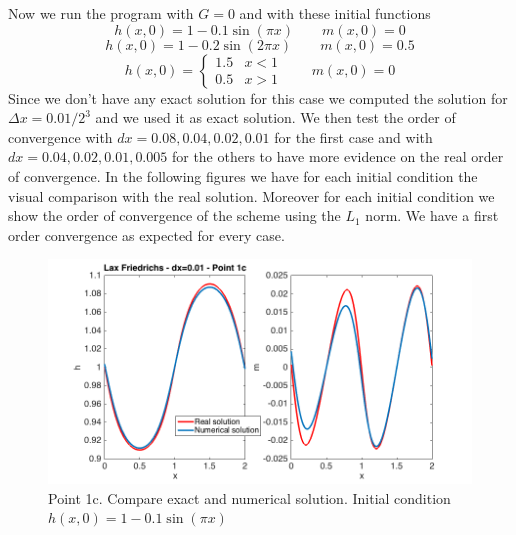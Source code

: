 \documentclass[oneside,12pt]{book}  %
\theoremstyle{plain}
\theoremstyle{definition}
\theoremstyle{remark}
\numberwithin{equation}{chapter} %
\begin{document}
Now we run the program with $G=0$ and with these initial functions
\begin{equation}
  \label{eq:initial_solution_1c_1}
  h(x,0)=1-0.1\sin(\pi x)\quad \quad m(x,0)=0
\end{equation}
\begin{equation}
  \label{eq:initial_solution_1c_2}
  h(x,0)=1-0.2\sin(2\pi x)\quad \quad m(x,0)=0.5
\end{equation}
\begin{equation}
  \label{eq:initial_solution_1c_2}
  h(x,0)=\left\{ \begin{matrix} 1.5 & x<1 \\ 0.5 &x>1\end{matrix}\right. \quad \quad m(x,0)=0
\end{equation}
Since we don't have any exact solution for this case we computed the
solution for $\Delta x=0.01/2^3$ and we used it as exact solution. We
then test the order of convergence with $dx=0.08, 0.04, 0.02,
0.01$ for the first case and with $dx=0.04, 0.02,
0.01, 0.005$ for the others to have more evidence on the real order of
convergence. In the following figures we have for each initial
condition the visual comparison with the real solution. Moreover for
each initial condition we show the order of convergence of the scheme
using the $L_1$ norm. We have a first order convergence as expected
for every case.

\begin{figure}[h]
\label{img:lf_1c_1_solution}
\centering
\includegraphics[scale=0.5]{Immagini/LF/1c-1-solution.png}
\caption{Point 1c. Compare exact and numerical solution. Initial condition $h(x,0)=1-0.1\sin(\pi x)$}
\end{figure}
\end{document}
